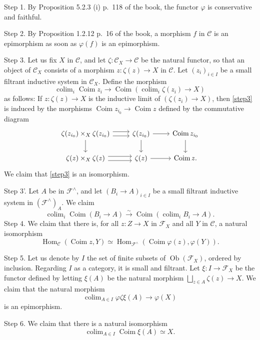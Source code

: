 \documentclass[12pt]{article}%
\theoremstyle{remark}
\theoremstyle{definition}
\newcommand{\nn}{\noindent}
\newcommand{\C}{\mathcal C}
\newcommand{\F}{\mathcal F}
\newcommand{\pp}{\varphi}
\DeclareMathOperator*{\colim}{colim}%
\DeclareMathOperator{\Coim}{Coim}
\DeclareMathOperator{\Hom}{Hom}%
\DeclareMathOperator{\Ob}{Ob}
\begin{document}
\nn Step 1. By Proposition 5.2.3 (i) p.~118 of the book, the functor $\pp$ is conservative and faithful.

\nn Step 2. By Proposition 1.2.12 p.~16 of the book, a morphism $f$ in $\C$ is an epimorphism as soon as $\pp(f)$ is an epimorphism.

\nn Step 3. Let us fix $X$ in $\C$, and let $\zeta:\C_X\to\C$ be the natural functor, so that an object of $\C_X$ consists of a morphism $z:\zeta(z)\to X$ in $\C$. Let $(z_i)_{i\in I}$ be a small filtrant inductive system in $\C_X$. Define the morphism
% 
\begin{equation}\label{step3}
\colim_i\Coim z_i\to\Coim\left(\colim_i\zeta(z_i)\to X\right)
\end{equation}
%
as follows: If $z:\zeta(z)\to X$ is the inductive limit of $(\zeta(z_i)\to X)$, then \eqref{step3} is induced by the morphisms $\Coim z_{i_0}\to\Coim z$ defined by the commutative diagram 
$$
\begin{tikzcd}
\zeta(z_{i_0})\times_X\zeta(z_{i_0})\ar{d}\ar[yshift=0.7ex]{r}\ar[yshift=-0.7ex]{r}&\zeta(z_{i_0})\ar{d}\ar{r}&\Coim z_{i_0}\ar{d}\\ 
\zeta(z)\times_X\zeta(z)\ar[yshift=0.7ex]{r}\ar[yshift=-0.7ex]{r}&\zeta(z)\ar{r}&\Coim z.
\end{tikzcd}
$$ 
We claim that \eqref{step3} is an isomorphism.

\nn Step 3'. Let $A$ be in $\F^\wedge$, and let $(B_i\to A)_{i\in I}$ be a small filtrant inductive system in $(\F^\wedge)_A$. We claim 
$$
\colim_i\Coim(B_i\to A)\xrightarrow{\sim}
\Coim\left(\colim_iB_i\to A\right).
$$
Step 4. We claim that there is, for all $z:Z\to X$ in $\F_X$ and all $Y$ in $\C$, a natural isomorphism 
$$
\Hom_\C(\Coim z,Y)\simeq\Hom_{\F^\wedge}(\Coim\pp(z),\pp(Y)).
$$ 

\nn Step 5. Let us denote by $I$ the set of finite subsets of $\Ob(\F_X)$, ordered by inclusion. Regarding $I$ as a category, it is small and filtrant. Let $\xi:I\to\F_X$ be the functor defined by letting $\xi(A)$ be the natural morphism $\bigsqcup_{z\in A}\zeta(z)\to X$. We claim that the natural morphism 
$$
\colim_{A\in I}\pp\zeta\xi(A)\to\pp(X) 
$$ 
is an epimorphism.

\nn Step 6. We claim that there is a natural isomorphism 
$$
\colim_{A\in I}\Coim\xi(A)\simeq X. 
$$
\end{document}
